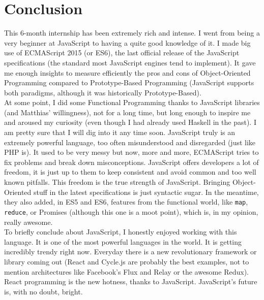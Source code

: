 \chapter{Conclusion}

This 6-month internship has been extremely rich and intense. I went from being a very beginner at JavaScript to having a quite good knowledge of it. I made big use of ECMAScript 2015 (or ES6), the last official release of the JavaScript specifications (the standard most JavaScript engines tend to implement). It gave me enough insights to measure efficiently the pros and cons of Object-Oriented Programming compared to Prototype-Based Programming (JavaScript supports both paradigms, although it was historically Prototype-Based).\\
At some point, I did some Functional Programming thanks to JavaScript libraries (and Matthias' willingness), not for a long time, but long enough to inspire me and aroused my curiosity (even though I had already used Haskell in the past). I am pretty sure that I will dig into it any time soon. JavaScript truly is an extremely powerful language, too often misunderstood and disregarded (just like PHP is). It used to be very messy but now, more and more, ECMAScript tries to fix problems and break down misconceptions. JavaScript offers developers a lot of freedom, it is just up to them to keep consistent and avoid common and too well known pitfalls. This freedom is the true strength of JavaScript. Bringing Object-Oriented stuff in the latest specifications is just syntactic sugar. In the meantime, they also added, in ES5 and ES6, features from the functional world, like \lstinline{map}, \lstinline{reduce}, or Promises (although this one is a moot point), which is, in my opinion, really awesome.\\
To briefly conclude about JavaScript, I honestly enjoyed working with this language. It is one of the most powerful languages in the world. It is getting incredibly trendy right now. Everyday there is a new revolutionary framework or library coming out (React and Cycle.js are probably the best examples, not to mention architectures like Facebook's Flux and Relay or the awesome Redux). React programming is the new hotness, thanks to JavaScript. JavaScript's future is, with no doubt, bright.

\bigskip

